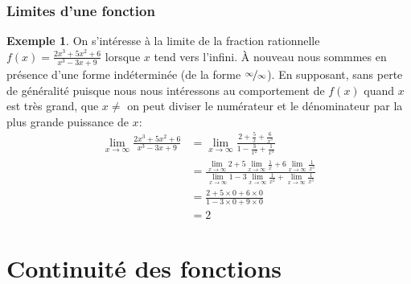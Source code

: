 \documentclass[10pt,notheorems]{beamer}
\theoremstyle{plain}
\theoremstyle{definition} %
\newtheorem{example}{Exemple}
\begin{document}
\begin{frame}
  \frametitle{Limites d'une fonction}

  \begin{example}
    On s'intéresse à la limite de la fraction rationnelle  $f(x) = \frac{2x^3+5x^2+6}{x^3-3x+9}$ lorsque $x$ tend vers l'infini. À nouveau nous sommmes en présence d'une forme indéterminée (de la forme $\nicefrac{\infty}{\infty}$). En supposant, sans perte de généralité puisque nous nous intéressons au comportement de $f(x)$ quand $x$ est très grand, que $x\neq$ on peut diviser le numérateur et le dénominateur par la plus grande puissance de $x$:
    \[
      \begin{split}
        \lim_{x\rightarrow \infty}\frac{2x^3+5x^2+6}{x^3-3x+9} &= \lim_{x\rightarrow \infty}\frac{2+\frac{5}{x}+\frac{6}{x^3}}{1-\frac{3}{x^2}+\frac{1}{x^3}}\\
        &= \frac{ \lim_{x\rightarrow \infty}2+ 5\lim_{x\rightarrow \infty}\frac{1}{x}+6\lim_{x\rightarrow \infty}\frac{1}{x^3}}{\lim_{x\rightarrow \infty} 1-3\lim_{x\rightarrow \infty}\frac{1}{x^2}+\lim_{x\rightarrow \infty}\frac{1}{x^3}}\\
        &= \frac{2+5\times 0 + 6\times 0}{1-3\times 0 + 9\times 0}\\
        &= 2
      \end{split}
    \]

  \end{example}

\end{frame}

\section{Continuité des fonctions}
\end{document}
